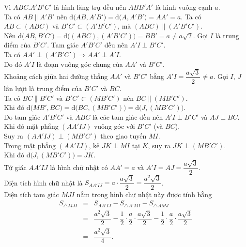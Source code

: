 \begin{ex}
{\begin{center}
		\end{center}
		\begin{itemchoice}
			\itemch Vì $ABC.A'B'C'$ là hình lăng trụ đều nên $ABB'A'$ là hình vuông cạnh $a$.\\
			Ta có $AB\parallel A'B'$ nên $\mathrm{d}\big(AB,A'B'\big)=\mathrm{d}\big(A,A'B'\big)=AA'=a$.
			\itemch Ta có $AB\subset (ABC)$ và $B'C'\subset (A'B'C')$, mà $(ABC)\parallel (A'B'C')$.\\
			Nên $\mathrm{d}\big(AB,B'C'\big)=\mathrm{d}\big((ABC),(A'B'C')\big)=BB'=a\ne a\sqrt{2}$.
			\itemch Gọi $I$ là trung điểm của $B'C'$. Tam giác $A'B'C'$ đều nên $A'I\perp B'C'$.\\
			Ta có $AA'\perp (A'B'C')\Rightarrow AA'\perp A'I$.\\
			Do đó $A'I$ là đoạn vuông góc chung của $AA'$ và $B'C'$.\\
			Khoảng cách giữa hai đường thẳng $AA'$ và $B'C'$ bằng $A'I=\dfrac{a\sqrt{3}}{2}\ne a$.
			\itemch Gọi $I$, $J$ lần lượt là trung điểm của $B'C'$ và $BC$.\\
			Ta có $BC\parallel B'C'$ và $B'C'\subset (MB'C')$ nên $BC\parallel (MB'C')$.\\
			Khi đó $\mathrm{d}\big(MB',BC\big)=\mathrm{d}\big(BC,(MB'C')\big)=\mathrm{d}\big(J,(MB'C')\big)$.\\
			Do tam giác $A'B'C'$ và $ABC$ là các tam giác đều nên $A'I\perp B'C'$ và $AJ\perp BC$.\\ Khi đó mặt phẳng $(AA'IJ)$ vuông góc với $B'C'$ (và $BC$).\\
			Suy ra $(AA'IJ)\perp (MB'C')$ theo giao tuyến $MI$.\\
			Trong mặt phẳng $(AA'IJ)$, kẻ $JK\perp MI$ tại $K$, suy ra $JK\perp (MB'C')$.\\
			Khi đó $\mathrm{d}\big(J,(MB'C')\big)=JK$.\\
			Tứ giác $AA'IJ$ là hình chữ nhật có $AA'=a$ và $A'I=AJ=\dfrac{a\sqrt{3}}{2}$.\\
			Diện tích hình chữ nhật là $S_{AA'IJ}=a\cdot \dfrac{a\sqrt{3}}{2}=\dfrac{a^2\sqrt{3}}{2}$.\\
			Diện tích tam giác $MJI$ nằm trong hình chữ nhật này được tính bằng
			\begin{eqnarray*}
S_{\triangle MJI}&=&S_{AA'IJ}-S_{\triangle A'MI}-S_{\triangle AMJ}\\&=&\dfrac{a^2\sqrt{3}}{2}-\dfrac{1}{2}\cdot \dfrac{a}{2}\cdot \dfrac{a\sqrt{3}}{2}-\dfrac{1}{2}\cdot \dfrac{a}{2}\cdot \dfrac{a\sqrt{3}}{2}\\&=&\dfrac{a^2\sqrt{3}}{4}.

\end{eqnarray*}
\end{itemchoice}}
\end{ex}
